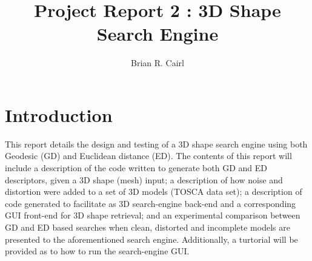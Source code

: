 \documentclass[12pt]{article}
\title{Project Report 2 : 3D Shape Search Engine}
\author{Brian R. Cairl}
\begin{document}
\maketitle
\pagebreak

\newcommand{\ith}{i$^{th}$}
\newcommand{\st}{\hspace{0.5mm}:\hspace{0.5mm}}
\newcommand{\fa}{\hspace{0.5mm}\forall\hspace{0.5mm}}


\section*{Introduction}
	
	\noindent
	This report details the design and testing of a 3D shape search engine using both Geodesic (GD) and Euclidean distance (ED). The contents of this report will include a description of the code written to generate both GD and ED descriptors, given a 3D shape (mesh) input; a description of how noise and distortion were added to a set of 3D models (TOSCA data set); a description of code generated to facilitate as 3D search-engine back-end and a corresponding GUI front-end for 3D shape retrieval; and an experimental comparison between GD and ED based searches when clean, distorted and incomplete models are presented to the aforementioned search engine. Additionally, a turtorial will be provided as to how to run the search-engine GUI.

	{}
	
\end{document}
